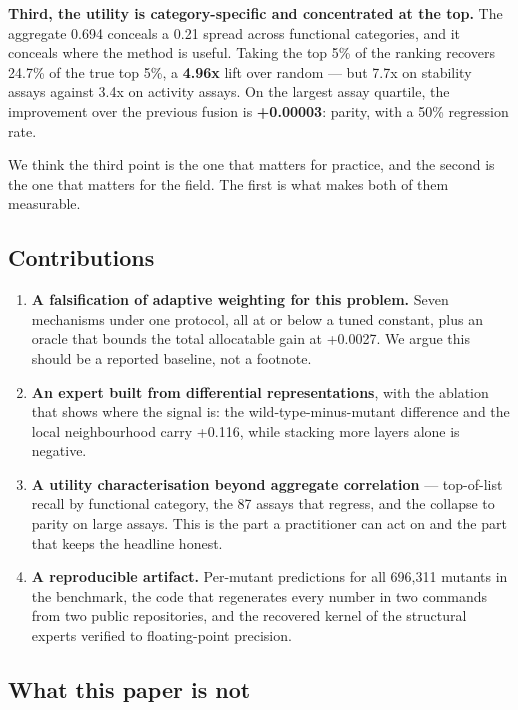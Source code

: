 \textbf{Third, the utility is category-specific and concentrated at the top.} The aggregate 0.694 conceals
a 0.21 spread across functional categories, and it conceals where the method is useful. Taking the top
5\% of the ranking recovers 24.7\% of the true top 5\%, a \textbf{4.96x} lift over random --- but 7.7x on
stability assays against 3.4x on activity assays. On the largest assay quartile, the improvement over
the previous fusion is \textbf{+0.00003}: parity, with a 50\% regression rate.

We think the third point is the one that matters for practice, and the second is the one that matters
for the field. The first is what makes both of them measurable.

\hypertarget{contributions}{%
\subsection{Contributions}\label{contributions}}

\begin{enumerate}
\def\labelenumi{\arabic{enumi}.}
\item
  \textbf{A falsification of adaptive weighting for this problem.} Seven mechanisms under one protocol, all
  at or below a tuned constant, plus an oracle that bounds the total allocatable gain at +0.0027. We
  argue this should be a reported baseline, not a footnote.
\item
  \textbf{An expert built from differential representations}, with the ablation that shows where the signal
  is: the wild-type-minus-mutant difference and the local neighbourhood carry +0.116, while stacking
  more layers alone is negative.
\item
  \textbf{A utility characterisation beyond aggregate correlation} --- top-of-list recall by functional
  category, the 87 assays that regress, and the collapse to parity on large assays. This is the part a
  practitioner can act on and the part that keeps the headline honest.
\item
  \textbf{A reproducible artifact.} Per-mutant predictions for all 696,311 mutants in the benchmark, the
  code that regenerates every number in two commands from two public repositories, and the recovered
  kernel of the structural experts verified to floating-point precision.
\end{enumerate}

\hypertarget{what-this-paper-is-not}{%
\subsection{What this paper is not}\label{what-this-paper-is-not}}

